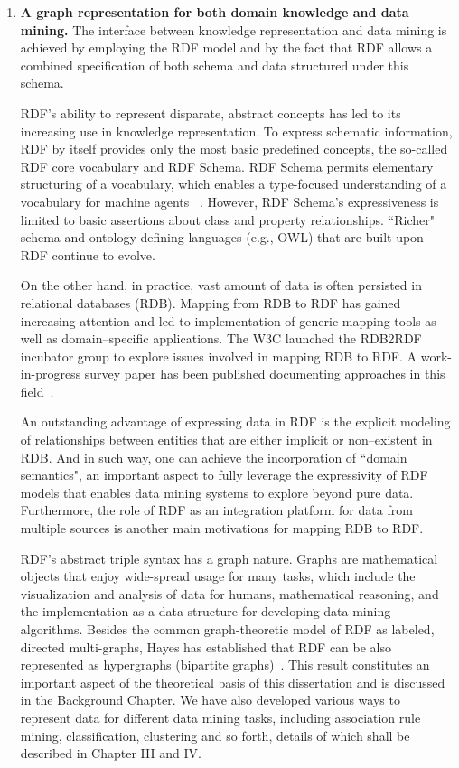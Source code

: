 \begin{enumerate}
\item \textbf{A graph representation for both domain knowledge and data mining.}
    The interface between knowledge representation and data mining is achieved by employing the RDF model and by the fact that RDF allows a combined specification of both schema and data structured under this schema.

    RDF's ability to represent disparate, abstract concepts has led to its increasing use in knowledge representation. To express schematic information, RDF by itself provides only the most basic predefined concepts, the so-called RDF core vocabulary and RDF Schema. RDF Schema permits elementary structuring of a vocabulary, which enables a type-focused understanding of a vocabulary for machine agents %
    ~\cite{GraphModelRDF}. However, RDF Schema's expressiveness is limited to basic assertions about class and property relationships. ``Richer" schema and ontology defining languages (e.g., OWL) that are built upon RDF continue to evolve. %

    On the other hand, in practice, vast amount of data is often persisted in relational databases (RDB). Mapping from RDB to RDF has gained increasing attention and led to implementation of generic mapping tools as well as domain--specific applications.  The W3C launched the RDB2RDF incubator group to explore issues involved in mapping RDB to RDF. A work-in-progress survey paper has been published documenting approaches in this field~\cite{RDB2RDF}.

    An outstanding advantage of expressing data in RDF is the explicit modeling of relationships between entities that are either implicit or non--existent in RDB. And in such way, one can achieve the incorporation of ``domain semantics", an important aspect to fully leverage the expressivity of RDF models that enables data mining systems to explore beyond pure data. Furthermore, the role of RDF as an integration platform for data from multiple sources is another main motivations for mapping RDB to RDF.

    RDF's abstract triple syntax has a graph nature. Graphs are mathematical objects that enjoy wide-spread usage for many tasks, which include the visualization and analysis of data for humans, mathematical reasoning, and the implementation as a data structure for developing data mining algorithms. Besides the common graph-theoretic model of RDF as labeled, directed multi-graphs, Hayes has established that RDF can be also represented as hypergraphs (bipartite graphs)~\cite{GraphModelRDF}. This result constitutes an important aspect of the theoretical basis of this dissertation and is discussed in the Background Chapter. We have also developed various ways to represent data for different data mining tasks, including association rule mining, classification, clustering and so forth, details of which shall be described in Chapter III and IV.


\end{enumerate}
